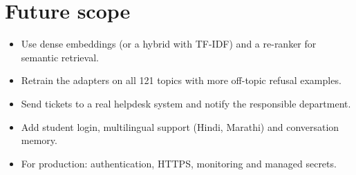 \documentclass[11pt,a4paper]{report}
\begin{document}
\section{Future scope}
\begin{itemize}
  \item Use dense embeddings (or a hybrid with TF-IDF) and a re-ranker for semantic retrieval.
  \item Retrain the adapters on all 121 topics with more off-topic refusal examples.
  \item Send tickets to a real helpdesk system and notify the responsible department.
  \item Add student login, multilingual support (Hindi, Marathi) and conversation memory.
  \item For production: authentication, HTTPS, monitoring and managed secrets.
\end{itemize}
\end{document}
